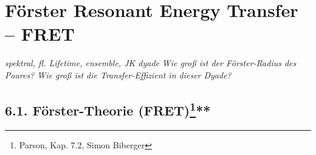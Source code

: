 

\chapter{Förster Resonant Energy Transfer -- FRET}

\textit{spektral, fl. Lifetime, ensemble, JK dyade
}
\textit{Wie groß ist der Förster-Radius des Paares? Wie groß ist die Transfer-Effizient in dieser Dyade?
}





\section{6.1. Förster-Theorie  (FRET)\protect\footnote{Parson, Kap. 7.2, Simon Biberger}\hfill ***} 

